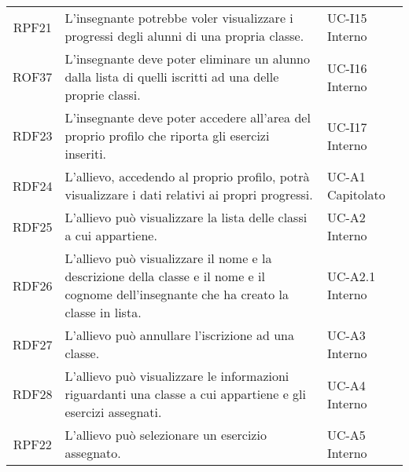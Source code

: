 \begin{tabularx}{\textwidth}{| c | p{10cm} | X |}
		RPF21 & L'insegnante potrebbe voler visualizzare i progressi degli alunni di una propria classe. & UC-I15 \newline Interno\\
		ROF37 & L'insegnante deve poter eliminare un alunno dalla lista di quelli iscritti ad una delle proprie classi. & UC-I16 \newline Interno\\
		RDF23 & L'insegnante deve poter accedere all'area del proprio profilo che riporta gli esercizi inseriti. & UC-I17 \newline Interno\\

		RDF24 & L'allievo, accedendo al proprio profilo, potrà visualizzare i dati relativi ai propri progressi. & UC-A1 \newline Capitolato\\		
		RDF25 & L'allievo può visualizzare la lista delle classi a cui appartiene. & UC-A2 \newline Interno\\
		RDF26 & L'allievo può visualizzare il nome e la descrizione della classe e il nome e il cognome dell'insegnante che ha creato la classe in lista. & UC-A2.1 \newline Interno\\
		RDF27 & L'allievo può annullare l'iscrizione ad una classe. & UC-A3 \newline Interno\\
		RDF28 & L'allievo può visualizzare le informazioni riguardanti una classe a cui appartiene e gli esercizi assegnati. & UC-A4 \newline Interno\\
		RPF22 & L'allievo può selezionare un esercizio assegnato. & UC-A5 \newline Interno\\


\end{tabularx}
